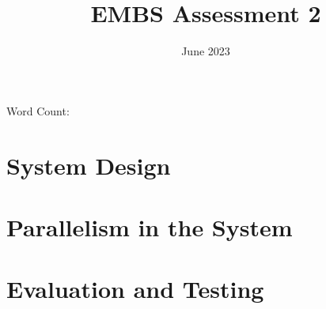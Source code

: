 \documentclass[11pt]{article}
\title{EMBS Assessment 2}
\author{}
\date{June 2023}
\begin{document}
\begin{titlepage}
\maketitle
Word Count: 
\tableofcontents
\end{titlepage}

\section{System Design}

\newpage
\section{Parallelism in the System}

\newpage
\section{Evaluation and Testing}
\end{document}
